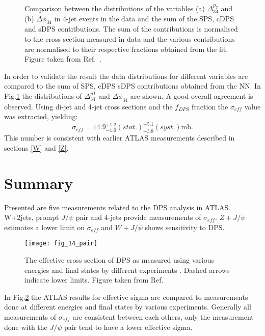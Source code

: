 \documentclass{ws-rv9x6}
\begin{document}
\begin{figure}[ht]
\centerline{
  \hspace*{4pt}
}
\caption{Comparison between the distributions of the variables (a) $\Delta_{34}^{p_T}$ and (b) $\Delta\phi_{34}$ in 4-jet events in the data and the sum of the SPS, cDPS and sDPS contributions. The sum of the contributions is normalised to the cross section measured in data and the various contributions are normalised to their respective fractions obtained from the fit. Figure taken from Ref.~.}\label{validation}
\end{figure}
 
In order to validate the result the data distributions for different variables are compared to the sum of SPS, cDPS sDPS contributions obtained from the NN. In Fig.\ref{validation} the distributions of  $\Delta^{pT}_{34}$ and $\Delta\phi_{34}$ are shown. A good overall agreement is observed.
Using di-jet and 4-jet cross sections and the $f_{D\!P\!S}$ fraction the $\sigma_{e\!f\!f}$ value was extracted, yielding:
\begin{equation}
\sigma_{e\!f\!f} = 14.9^{+1.2}_{-1.0} (stat.) ^{+5.1}_{-3.8} (syst.) \textrm{mb}.
\end{equation}
This number is consistent with earlier ATLAS measurements described in sections \ref{W} and \ref{Z}.

\section{Summary}
Presented are five measurements related to the DPS analysis in ATLAS. W+2jets, prompt $J/\psi$ pair and 4-jets provide measurements of $\sigma_{e\!f\!f}$. $Z+J/\psi$ estimates a lower limit on $\sigma_{e\!f\!f}$ and $W+J/\psi$ shows sensitivity to DPS.
\begin{figure}
\centerline{\texttt{[image: fig\_14\_pair]}}
\caption{The effective cross section of DPS as measured using various energies and final states by different experiments \cite{afs,ua2,cdf1,cdf2,d01,d02,d03,d04,d05,cms,lhcb1,lhcb2,dps1,dps3,dps4,dps5}. Dashed arrows indicate lower limits. Figure taken from Ref.~} \label{compar}
\end{figure}
In Fig.\ref{compar} the ATLAS results for effective sigma are compared to measurements done at different energies and final states by various experiments. 
Generally all measurements of $\sigma_{e\!f\!f}$ are consistent between each others, only the measurement done with the $J/\psi$ pair tend to have a  lower effective sigma.
\end{document}
